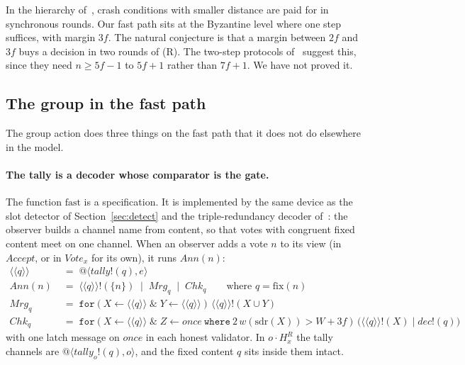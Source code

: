 \documentclass[11pt]{article}
\makeatletter
\theoremstyle{definition}
\theoremstyle{remark}
\newcommand{\snd}[2]{#1!(#2)}
\newcommand{\qn}[2]{@\langle #1, #2\rangle}
\newcommand{\act}[2]{#1\cdot #2}
\newcommand{\sender}{\mathrm{sdr}}
\makeatother
\begin{document}
In the hierarchy of~\cite{mrr-sync}, crash conditions with smaller distance
are paid for in synchronous rounds. Our fast path sits at the Byzantine level
where one step suffices, with margin $3f$. The natural conjecture is that a
margin between $2f$ and $3f$ buys a decision in two rounds of (R). The two-step
protocols of~\cite{fab,ktz} suggest this, since they need $n\ge5f-1$ to
$5f+1$ rather than $7f+1$. We have not proved it.

\subsection{The group in the fast path}\label{sec:fastgroup}

The group action does three things on the fast path that it does not do
elsewhere in the model.

\paragraph{The tally is a decoder whose comparator is the gate.}
The function $\mathrm{fast}$ is a specification. It is implemented by the same
device as the slot detector of Section~\ref{sec:detect} and the
triple-redundancy decoder of~\cite[\S7]{oriented}: the observer builds a channel
name from content, so that votes with congruent fixed content meet on one
channel. When an observer adds a vote $n$ to its view (in $\mathit{Accept}$,
or in $\mathit{Vote}_x$ for its own), it runs $\mathit{Ann}(n)$:
\begin{align*}
\langle\!\langle q\rangle\!\rangle &\;=\;
  \qn{\snd{\mathit{tally}}{q}}{e}\\
\mathit{Ann}(n) &\;=\;
  \snd{\langle\!\langle q\rangle\!\rangle}{\{n\}}\;\mid\;
  \mathit{Mrg}_q\;\mid\;\mathit{Chk}_q
  \qquad\text{where } q=\mathrm{fix}(n)\\
\mathit{Mrg}_q &\;=\;
  \mathtt{for}(X\leftarrow\langle\!\langle q\rangle\!\rangle\;\&\;
  Y\leftarrow\langle\!\langle q\rangle\!\rangle)\,
  \snd{\langle\!\langle q\rangle\!\rangle}{X\cup Y}\\
\mathit{Chk}_q &\;=\;
  \mathtt{for}(X\leftarrow\langle\!\langle q\rangle\!\rangle\;\&\;
  Z\leftarrow\mathit{once}\ \mathtt{where}\ 2\,w(\sender(X))>W+3f)\,
  \bigl(\snd{\langle\!\langle q\rangle\!\rangle}{X}\mid
  \snd{\mathit{dec}}{q}\bigr)
\end{align*}
with one latch message on $\mathit{once}$ in each honest validator. In
$\act{o}{H^R_x}$ the tally channels are
$\qn{\snd{\mathit{tally}_o}{q}}{o}$, and the fixed content $q$ sits inside them
intact.
\end{document}
